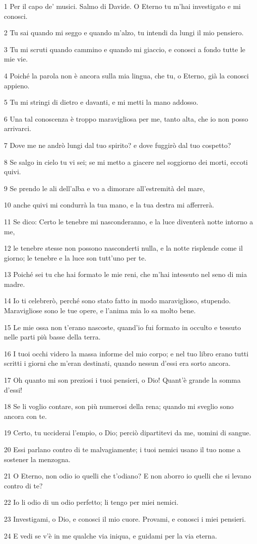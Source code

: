 \par 1 Per il capo de' musici. Salmo di Davide. O Eterno tu m'hai investigato e mi conosci.
\par 2 Tu sai quando mi seggo e quando m'alzo, tu intendi da lungi il mio pensiero.
\par 3 Tu mi scruti quando cammino e quando mi giaccio, e conosci a fondo tutte le mie vie.
\par 4 Poiché la parola non è ancora sulla mia lingua, che tu, o Eterno, già la conosci appieno.
\par 5 Tu mi stringi di dietro e davanti, e mi metti la mano addosso.
\par 6 Una tal conoscenza è troppo maravigliosa per me, tanto alta, che io non posso arrivarci.
\par 7 Dove me ne andrò lungi dal tuo spirito? e dove fuggirò dal tuo cospetto?
\par 8 Se salgo in cielo tu vi sei; se mi metto a giacere nel soggiorno dei morti, eccoti quivi.
\par 9 Se prendo le ali dell'alba e vo a dimorare all'estremità del mare,
\par 10 anche quivi mi condurrà la tua mano, e la tua destra mi afferrerà.
\par 11 Se dico: Certo le tenebre mi nasconderanno, e la luce diventerà notte intorno a me,
\par 12 le tenebre stesse non possono nasconderti nulla, e la notte risplende come il giorno; le tenebre e la luce son tutt'uno per te.
\par 13 Poiché sei tu che hai formato le mie reni, che m'hai intessuto nel seno di mia madre.
\par 14 Io ti celebrerò, perché sono stato fatto in modo maraviglioso, stupendo. Maravigliose sono le tue opere, e l'anima mia lo sa molto bene.
\par 15 Le mie ossa non t'erano nascoste, quand'io fui formato in occulto e tessuto nelle parti più basse della terra.
\par 16 I tuoi occhi videro la massa informe del mio corpo; e nel tuo libro erano tutti scritti i giorni che m'eran destinati, quando nessun d'essi era sorto ancora.
\par 17 Oh quanto mi son preziosi i tuoi pensieri, o Dio! Quant'è grande la somma d'essi!
\par 18 Se li voglio contare, son più numerosi della rena; quando mi sveglio sono ancora con te.
\par 19 Certo, tu ucciderai l'empio, o Dio; perciò dipartitevi da me, uomini di sangue.
\par 20 Essi parlano contro di te malvagiamente; i tuoi nemici usano il tuo nome a sostener la menzogna.
\par 21 O Eterno, non odio io quelli che t'odiano? E non aborro io quelli che si levano contro di te?
\par 22 Io li odio di un odio perfetto; li tengo per miei nemici.
\par 23 Investigami, o Dio, e conosci il mio cuore. Provami, e conosci i miei pensieri.
\par 24 E vedi se v'è in me qualche via iniqua, e guidami per la via eterna.

